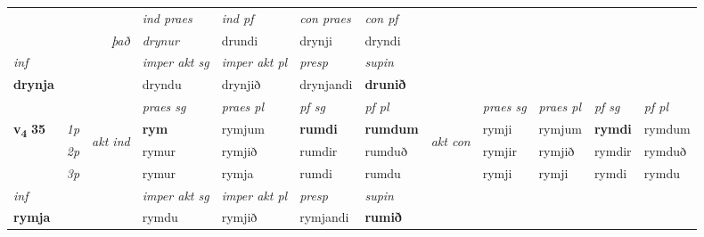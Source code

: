 \begin{longtable}[l]{X>{\footnotesize\itshape}llXXXXlXXXX}
   && &  \textit{ind praes} & \textit{ind pf} & \textit{con praes} & \textit{con pf} \\*
\multicolumn{3}{r}{\textit{það}} & drynur & drundi & drynji & dryndi \\*

\cmidrule{4-7}
   {\textit{inf}} & &  & \textit{imper akt sg} & \textit{imper akt pl}   & \textit{presp} & \textit{supin}   \\*
  {\textbf{drynja}} & && dryndu  & drynjið   & drynjandi &  \textbf{drunið}   \\*

\midrule

 & &   & \textit{praes sg}  & \textit{praes pl}    & \textit{ pf sg} & \textit{pf pl} & & \textit{praes sg}  & \textit{praes pl}    & \textit{pf sg} & \textit{pf pl }  \\ \cmidrule{4-7} \cmidrule{9-12}
 \multirow{2}{*}{{{\textbf{v{\textsubscript{4}}} \Large{\textbf{35}}}}}  & 1p & \multirow{3}{*}{\begin{turn}{90}\textit{akt ind}\end{turn}} & \textbf{rym} & rymjum & \textbf{rumdi} & \textbf{rumdum} & \multirow{3}{*}{\begin{turn}{90}\textit{akt con}\end{turn}} &rymji & rymjum & \textbf{rymdi} & rymdum\\*
 & 2p &  &  rymur  & rymjið & rumdir & rumduð & & rymjir & rymjið & rymdir & rymduð \\*
 & 3p &  & rymur & rymja & rumdi & rumdu & & rymji & rymji& rymdi & rymdu \\*
\cmidrule{4-7} \cmidrule{9-12}

   {\textit{inf}} & &  & \textit{imper akt sg} & \textit{imper akt pl}   & \textit{presp} & \textit{supin}   \\*
  {\textbf{rymja}} & && rymdu  & rymjið   & rymjandi &  \textbf{rumið}   \\*

\midrule


\end{longtable}
